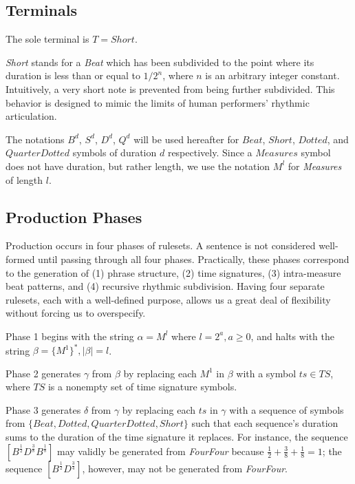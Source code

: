 \documentclass{article}
\begin{document}
\subsection{Terminals}

The sole terminal is $T={Short}$.

\emph{Short} stands for a \emph{Beat} which has been subdivided to the point where its duration is less than or equal to $1/2^n$, where $n$ is an arbitrary integer constant. Intuitively, a very short note is prevented from being further subdivided. This behavior is designed to mimic the limits of human performers’ rhythmic articulation.

The notations $B^d$, $S^d$, $D^d$, $Q^d$ will be used hereafter for $Beat$, $Short$, $Dotted$, and $QuarterDotted$ symbols of duration $d$ respectively. Since a $Measures$ symbol does not have duration, but rather length, we use the notation $M^l$ for \emph{Measures} of length $l$.

\subsection{Production Phases}


Production occurs in four phases of rulesets. A sentence is not considered well-formed until passing through all four phases. Practically, these phases correspond to the generation of (1) phrase structure, (2) time signatures, (3) intra-measure beat patterns, and (4) recursive rhythmic subdivision. Having four separate rulesets, each with a well-defined purpose, allows us a great deal of flexibility without forcing us to overspecify.

Phase 1 begins with the string $\alpha = M^l$ where $l=2^a, a \geq 0$, and halts with the string $\beta = \{ M^1 \}^*, |\beta| = l$.

Phase 2 generates $\gamma$ from $\beta$ by replacing each $M^1$ in $\beta$ with a symbol $ts \in TS$, where $TS$ is a nonempty set of time signature symbols.

Phase 3 generates $\delta$ from $\gamma$ by replacing each $ts$ in $\gamma$ with a sequence of symbols from $\{Beat,\allowbreak Dotted,\allowbreak QuarterDotted,\allowbreak Short \}$ such that each sequence's duration sums to the duration of the time signature it replaces. For instance, the sequence $[B^\frac{1}{2} D^\frac{3}{8} B^\frac{1}{8}]$ may validly be generated from \emph{FourFour} because $\frac{1}{2} + \frac{3}{8} + \frac{1}{8} = 1$; the sequence $[B^\frac{1}{2} D^\frac{3}{4}]$, however, may not be generated from \emph{FourFour}.
\end{document}
